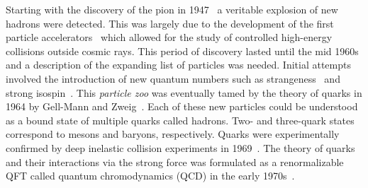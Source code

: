 Starting with the discovery of the pion in 1947~\cite{DiscoveryPimeson} a veritable explosion of new hadrons were detected.
This was largely due to the development of the first particle accelerators~\cite{ProductionHighSpeed} which allowed for the study of controlled high-energy collisions outside cosmic rays.
This period of discovery lasted until the mid 1960s and a description of the expanding list of particles was needed.
Initial attempts involved the introduction of new quantum numbers such as strangeness~\cite{Strange2, Strange3} and strong isospin~\cite{StrongIso1, StrongIso2, StrongIso3,StrongIso4}.
This \textit{particle zoo} was eventually tamed by the theory of quarks in 1964 by Gell-Mann and Zweig~\cite{GellMan1964,Zweig1964}.
Each of these new particles could be understood as a bound state of multiple quarks called hadrons.
Two- and three-quark states correspond to mesons and baryons, respectively.
Quarks were experimentally confirmed by deep inelastic collision experiments in 1969~\cite{Quark1, Quark2}.
The theory of quarks and their interactions via the strong force was formulated as a renormalizable QFT called quantum chromodynamics (QCD) in the early 1970s~\cite{QCD1,QCD2,QCD3}.

